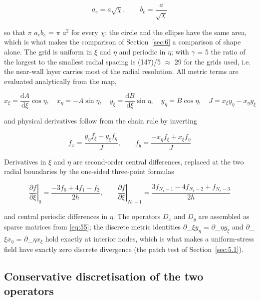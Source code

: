 \documentclass[preprint,12pt]{elsarticle}
\begin{document}
\begin{equation}
a_e=a\sqrt{\chi},\qquad b_e=\frac{a}{\sqrt{\chi}} 
\label{eq:53}
\end{equation}

so that $\pi$ $a_{e}b_{e}$ = $\pi$ $a^{2}$ for every $\chi$: the circle and the ellipse have the same area, which is what makes the comparison of Section~\ref{sec:6} a comparison of shape alone. The grid is uniform in $\xi$ and $\eta$ and periodic in $\eta$; with $\gamma$ = 5 the ratio of the largest to the smallest radial spacing is (147)/5 $\approx$ 29 for the grids used, i.e. the near-wall layer carries most of the radial resolution. All metric terms are evaluated analytically from the map,

\begin{equation}
x_\xi=\frac{\mathrm{d}A}{\mathrm{d}\xi}\cos\eta,\quad x_\eta=-A\sin\eta,\quad y_\xi=\frac{\mathrm{d}B}{\mathrm{d}\xi}\sin\eta,\quad y_\eta=B\cos\eta,\quad J=x_\xi y_\eta-x_\eta y_\xi 
\label{eq:54}
\end{equation}

and physical derivatives follow from the chain rule by inverting

\begin{equation}
f_x=\frac{y_\eta f_\xi-y_\xi f_\eta}{J},\qquad f_y=\frac{-x_\eta f_\xi+x_\xi f_\eta}{J} 
\label{eq:55}
\end{equation}

Derivatives in $\xi$ and $\eta$ are second-order central differences, replaced at the two radial boundaries by the one-sided three-point formulas

\begin{equation}
\left.\frac{\partial f}{\partial\xi}\right|_{0}=\frac{-3f_0+4f_1-f_2}{2h},\qquad \left.\frac{\partial f}{\partial\xi}\right|_{N_r-1}=\frac{3f_{N_r-1}-4f_{N_r-2}+f_{N_r-3}}{2h} 
\label{eq:56}
\end{equation}

and central periodic differences in $\eta$. The operators $D_{x}$ and $D_{y}$ are assembled as sparse matrices from \eqref{eq:55}; the discrete metric identities $\partial$\_{$\xi$}$y_{\eta}$ = $\partial$\_{$\eta$}$y_{\xi}$ and $\partial$\_{$\xi$}$x_{\eta}$ = $\partial$\_{$\eta$}$x_{\xi}$ hold exactly at interior nodes, which is what makes a uniform-stress field have exactly zero discrete divergence (the patch test of Section~\ref{sec:5.1}).

\subsection{Conservative discretisation of the two operators}
\label{sec:4.3}
\end{document}
